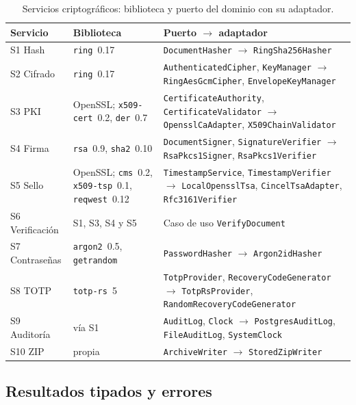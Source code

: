 \begin{table}[t]
  \centering
  \caption{Servicios criptográficos: biblioteca y puerto del dominio con su adaptador.}
  \label{tab:impl-servicios}
  
  \begin{tabularx}{\linewidth}{@{}l L{3.5cm} >{\raggedright\arraybackslash}X@{}}
    \toprule
    \textbf{Servicio} & \textbf{Biblioteca} & \textbf{Puerto $\rightarrow$ adaptador} \\
    \midrule
    S1 Hash & \texttt{ring}~0.17 & \texttt{DocumentHasher} $\rightarrow$ \texttt{RingSha256Hasher} \\
    S2 Cifrado & \texttt{ring}~0.17 & \texttt{AuthenticatedCipher}, \texttt{KeyManager} $\rightarrow$ \texttt{RingAesGcmCipher}, \texttt{EnvelopeKeyManager} \\
    S3 PKI & OpenSSL; \texttt{x509-cert}~0.2, \texttt{der}~0.7 & \texttt{CertificateAuthority}, \texttt{CertificateValidator} $\rightarrow$ \texttt{OpensslCaAdapter}, \texttt{X509ChainValidator} \\
    S4 Firma & \texttt{rsa}~0.9, \texttt{sha2}~0.10 & \texttt{DocumentSigner}, \texttt{SignatureVerifier} $\rightarrow$ \texttt{RsaPkcs1Signer}, \texttt{RsaPkcs1Verifier} \\
    S5 Sello & OpenSSL; \texttt{cms}~0.2, \texttt{x509-tsp}~0.1, \texttt{reqwest}~0.12 & \texttt{TimestampService}, \texttt{TimestampVerifier} $\rightarrow$ \texttt{LocalOpensslTsa}, \texttt{CincelTsaAdapter}, \texttt{Rfc3161Verifier} \\
    S6 Verificación & S1, S3, S4 y S5 & Caso de uso \texttt{VerifyDocument} \\
    S7 Contraseñas & \texttt{argon2}~0.5, \texttt{getrandom} & \texttt{PasswordHasher} $\rightarrow$ \texttt{Argon2idHasher} \\
    S8 TOTP & \texttt{totp-rs}~5 & \texttt{TotpProvider}, \texttt{RecoveryCodeGenerator} $\rightarrow$ \texttt{TotpRsProvider}, \texttt{RandomRecoveryCodeGenerator} \\
    S9 Auditoría & vía S1 & \texttt{AuditLog}, \texttt{Clock} $\rightarrow$ \texttt{PostgresAuditLog}, \texttt{FileAuditLog}, \texttt{SystemClock} \\
    S10 ZIP & propia & \texttt{ArchiveWriter} $\rightarrow$ \texttt{StoredZipWriter} \\
    \bottomrule
  \end{tabularx}
\end{table}

\subsection{Resultados tipados y errores}\label{sec:impl-servicios-anatomia}

